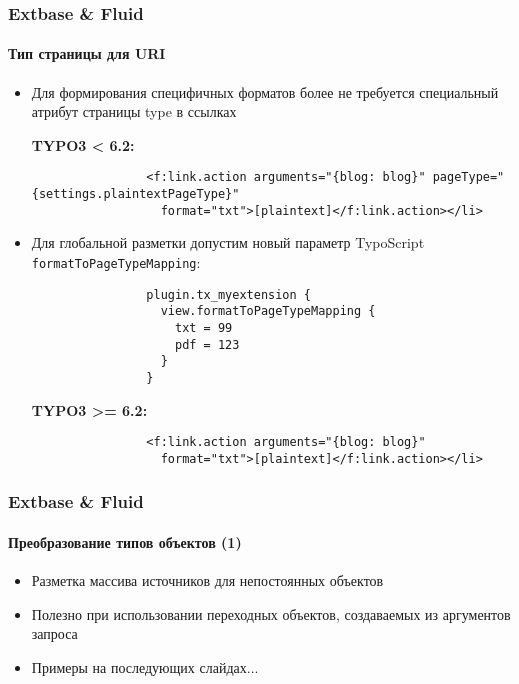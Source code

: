 
\begin{frame}[fragile]
	\frametitle{Extbase \& Fluid}
	\framesubtitle{Тип страницы для URI}

	\lstset{
		basicstyle=\tiny\ttfamily
	}

	\begin{itemize}
		\item Для формирования специфичных форматов более не требуется специальный атрибут страницы type в ссылках

			\smaller\textbf{TYPO3 < 6.2:}\normalsize
			\begin{lstlisting}
				<f:link.action arguments="{blog: blog}" pageType="{settings.plaintextPageType}"
				  format="txt">[plaintext]</f:link.action></li>
			\end{lstlisting}

		\item Для глобальной разметки допустим новый параметр TypoScript \texttt{formatToPageTypeMapping}:

			\begin{lstlisting}
				plugin.tx_myextension {
				  view.formatToPageTypeMapping {
				    txt = 99
				    pdf = 123
				  }
				}
			\end{lstlisting}

			\smaller\textbf{TYPO3 >= 6.2:}\normalsize
			\begin{lstlisting}
				<f:link.action arguments="{blog: blog}"
				  format="txt">[plaintext]</f:link.action></li>
			\end{lstlisting}

	\end{itemize}

\end{frame}


\begin{frame}[fragile]
	\frametitle{Extbase \& Fluid}
	\framesubtitle{Преобразование типов объектов (1)}

	\begin{itemize}
		\item Разметка массива источников для непостоянных объектов
		\item Полезно при использовании переходных объектов, создаваемых из аргументов запроса
		\item Примеры на последующих слайдах...

	\end{itemize}

\end{frame}

